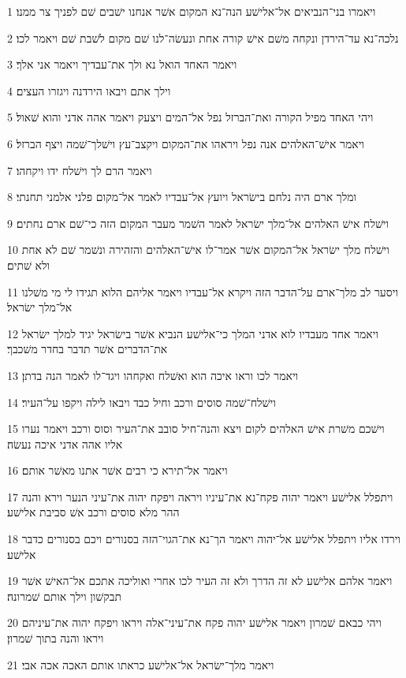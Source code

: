 \par 1 ויאמרו בני־הנביאים אל־אלישׁע הנה־נא המקום אשׁר אנחנו ישׁבים שׁם לפניך צר ממנו׃
\par 2 נלכה־נא עד־הירדן ונקחה משׁם אישׁ קורה אחת ונעשׂה־לנו שׁם מקום לשׁבת שׁם ויאמר לכו׃
\par 3 ויאמר האחד הואל נא ולך את־עבדיך ויאמר אני אלך׃
\par 4 וילך אתם ויבאו הירדנה ויגזרו העצים׃
\par 5 ויהי האחד מפיל הקורה ואת־הברזל נפל אל־המים ויצעק ויאמר אהה אדני והוא שׁאול׃
\par 6 ויאמר אישׁ־האלהים אנה נפל ויראהו את־המקום ויקצב־עץ וישׁלך־שׁמה ויצף הברזל׃
\par 7 ויאמר הרם לך וישׁלח ידו ויקחהו׃
\par 8 ומלך ארם היה נלחם בישׂראל ויועץ אל־עבדיו לאמר אל־מקום פלני אלמני תחנתי׃
\par 9 וישׁלח אישׁ האלהים אל־מלך ישׂראל לאמר השׁמר מעבר המקום הזה כי־שׁם ארם נחתים׃
\par 10 וישׁלח מלך ישׂראל אל־המקום אשׁר אמר־לו אישׁ־האלהים והזהירה ונשׁמר שׁם לא אחת ולא שׁתים׃
\par 11 ויסער לב מלך־ארם על־הדבר הזה ויקרא אל־עבדיו ויאמר אליהם הלוא תגידו לי מי משׁלנו אל־מלך ישׂראל׃
\par 12 ויאמר אחד מעבדיו לוא אדני המלך כי־אלישׁע הנביא אשׁר בישׂראל יגיד למלך ישׂראל את־הדברים אשׁר תדבר בחדר משׁכבך׃
\par 13 ויאמר לכו וראו איכה הוא ואשׁלח ואקחהו ויגד־לו לאמר הנה בדתן׃
\par 14 וישׁלח־שׁמה סוסים ורכב וחיל כבד ויבאו לילה ויקפו על־העיר׃
\par 15 וישׁכם משׁרת אישׁ האלהים לקום ויצא והנה־חיל סובב את־העיר וסוס ורכב ויאמר נערו אליו אהה אדני איכה נעשׂה׃
\par 16 ויאמר אל־תירא כי רבים אשׁר אתנו מאשׁר אותם׃
\par 17 ויתפלל אלישׁע ויאמר יהוה פקח־נא את־עיניו ויראה ויפקח יהוה את־עיני הנער וירא והנה ההר מלא סוסים ורכב אשׁ סביבת אלישׁע׃
\par 18 וירדו אליו ויתפלל אלישׁע אל־יהוה ויאמר הך־נא את־הגוי־הזה בסנורים ויכם בסנורים כדבר אלישׁע׃
\par 19 ויאמר אלהם אלישׁע לא זה הדרך ולא זה העיר לכו אחרי ואוליכה אתכם אל־האישׁ אשׁר תבקשׁון וילך אותם שׁמרונה׃
\par 20 ויהי כבאם שׁמרון ויאמר אלישׁע יהוה פקח את־עיני־אלה ויראו ויפקח יהוה את־עיניהם ויראו והנה בתוך שׁמרון׃
\par 21 ויאמר מלך־ישׂראל אל־אלישׁע כראתו אותם האכה אכה אבי׃
